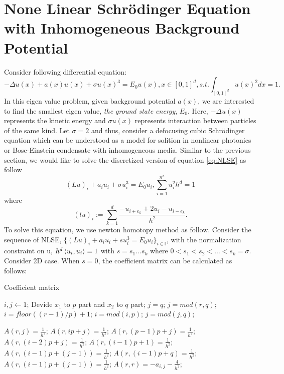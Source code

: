 \section{None Linear Schr\"{o}dinger Equation with Inhomogeneous Background Potential}
Consider following differential equation:
\begin{equation}
	-\Delta u(x) + a(x)u(x) + \sigma u(x)^3 = E_0 u(x), x\in [0,1]^d, s.t. \int_{[0,1]^d}u(x)^2 dx = 1.
	\label{eq:NLSE}
\end{equation}
In this eigen value problem, given background potential $a(x)$, we are interested to find the smallest eigen value, \textit{the ground state energy}, $E_0$. Here,  $-\Delta u(x)$ represents the kinetic energy and $\sigma u(x)$ represents interaction between particles of the same kind. Let $\sigma = 2$ and thus, consider a defocusing cubic Schr\"{o}dinger equation which can be understood as a model for solition in nonlinear photonics or Bose-Einstein condensate with inhomogeneous media. Similar to the previous section, we would like to solve the discretized version of equation \eqref{eq:NLSE} as follow
\begin{equation}
	(Lu)_i + a_i u_i + \sigma u_{i}^3 = E_0 u_i, \sum_{i=1}^{n^d} u_{i}^2 h^d = 1
\end{equation}
where
\begin{equation*}
	(lu)_i := \sum_{k=1}^{d} \frac{-u_{i+e_{k}} + 2u_i - u_{i-e_{k}}}{h^2}.
\end{equation*}
To solve this equation, we use newton homotopy method as follow. Consider the sequence of NLSE, $\{ (Lu)_i + a_i u_i + s u_{i}^{3} = E_0 u_i \}_{i \in \mathbb{I}}$, with the normalization constraint on u, $h^d \mathop{\langle u_i, u_i \rangle} = 1$ with $s = s_1\dots s_k$ where $0<s_1<s_2<\dots<s_k=\sigma$. Consider 2D case. When $s = 0$, the coefficient matrix can be calculated as follows:
\begin{algorithm}[H]
	\caption{Coefficient matrix} 
	\label{alg:NLSE_FDM_Matrix}
	\begin{algorithmic}[1]
		\State $i,j \leftarrow 1$;
		\State Devide $x_1$ to $p$ part and $x_2$ to $q$ part; 
		\State $j = q$;
		\Else 
		\State $j = mod(r,q)$;
		\EndIf
		\State $i = floor((r-1)/p)+1$;		
		\State $i = mod(i,p)$;
		\EndIf
		\State $j = mod(j,q)$;
		\EndIf
	\end{algorithmic}
\end{algorithm} 
\begin{algorithm}[H]
	\begin{algorithmic}[1]
		\State $A(r, j) = \frac{1}{h^2}$;
		\Else 
		\State $A(r, ip+j) = \frac{1}{h^2}$;
		\EndIf		
		\State $A(r, (p-1)p+j) = \frac{1}{h^2}$;
		\Else 
		\State $A(r, (i-2)p+j) = \frac{1}{h^2}$;
		\EndIf	
		\State $A(r, (i-1)p +1) = \frac{1}{h^2}$; 
		\Else 
		\State $A(r, (i-1)p+(j+1)) = \frac{1}{h^2}$;
		\EndIf	
		\State $A(r, (i-1)p+q) = \frac{1}{h^2}$;
		\Else 
		\State $A(r, (i-1)p+(j-1)) = \frac{1}{h^2}$;
		\EndIf		
		\State $A(r,r) = - a_{i,j} - \frac{4}{h^2}$;		
		\EndFor		
	\end{algorithmic}
\end{algorithm}
